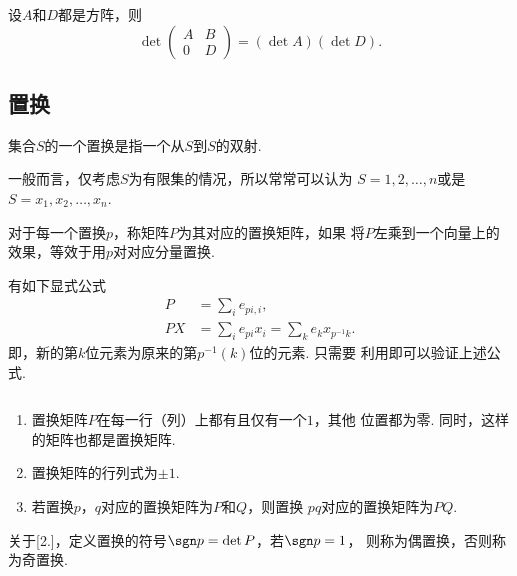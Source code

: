   \begin{lemma}[分块矩阵行列式]
    设$A$和$D$都是方阵，则
    \[
      \det \begin{pmatrix}
        A & B \\
        0 & D
      \end{pmatrix} = (\det A)(\det D).
    \]
  \end{lemma}

\subsection{置换}

  \begin{defi}
    集合$S$的一个置换是指一个从$S$到$S$的双射.
  \end{defi}
  \remark
    一般而言，仅考虑$S$为有限集的情况，所以常常可以认为
    $S={1,2,\dots,n}$或是$S={x_1,x_2,\dots,x_n}$.

  \begin{defi}[置换矩阵]
    对于每一个置换$p$，称矩阵$P$为其对应的置换矩阵，如果
    将$P$左乘到一个向量上的效果，等效于用$p$对对应分量置换.
  \end{defi}
  \remark
    有如下显式公式
    \[\begin{split}
      P &= \sum_i e_{pi,i}, \\
      PX &= \sum_i e_{pi}x_i = \sum_k e_k x_{p^{-1}k}.
    \end{split}\]
    即，新的第$k$位元素为原来的第$p^{-1}(k)$位的元素. 只需要
    利用即可以验证上述公式.

  \begin{pos}[置换矩阵]
    $\,$
    \begin{enumerate}
      \item 置换矩阵$P$在每一行（列）上都有且仅有一个$1$，其他
        位置都为零. 同时，这样的矩阵也都是置换矩阵.
      \item 置换矩阵的行列式为$\pm 1$.
      \item 若置换$p$，$q$对应的置换矩阵为$P$和$Q$，则置换
        $pq$对应的置换矩阵为$PQ$.
    \end{enumerate}
  \end{pos}
  \remark
    关于[2.]，定义置换的符号$\sgn p = \det P$，若$\sgn p = 1$，
    则称为偶置换，否则称为奇置换.


